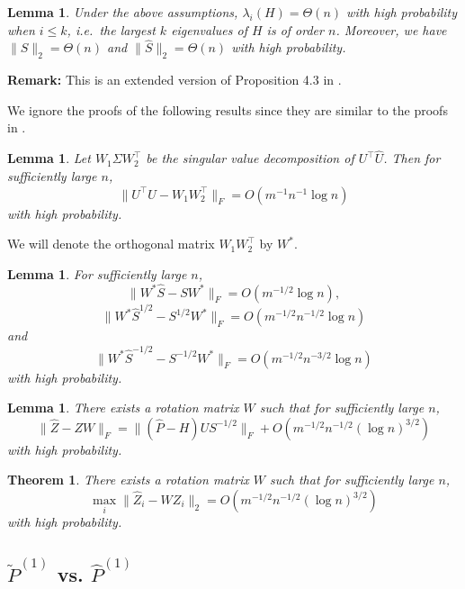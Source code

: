 \documentclass[a4paper]{article}
\newtheorem{lemma}[fact]{Lemma}
\newtheorem{theorem}[fact]{Theorem}
\renewcommand{\hat}{\widehat}
\begin{document}
\begin{lemma}
\label{lemma:eigSShatL1}
Under the above assumptions, $\lambda_i(H) = \Theta(n)$ with high probability when $i \le k$, i.e.\ the largest $k$ eigenvalues of $H$ is of order $n$. Moreover, we have $\| S \|_2 = \Theta(n)$ and $\| \hat{S} \|_2 = \Theta(n)$ with high probability.
\end{lemma}
\textbf{Remark:} This is an extended version of Proposition 4.3 in \citep{sussman2014consistent}.

We ignore the proofs of the following results since they are similar to the proofs in \citep{lyzinski2017community}.

\begin{lemma}
\label{lemma:AlmostOrthogonalL1}
Let $W_1 \Sigma W_2^{\top}$ be the singular value decomposition of $U^{\top} \hat{U}$. Then for sufficiently large $n$, 
\[
	\| U^{\top} \hat{U} - W_1 W_2^{\top} \|_F = O(m^{-1} n^{-1} \log n)
\]
with high probability.
\end{lemma}

We will denote the orthogonal matrix $W_1 W_2^{\top}$ by $W^*$.

\begin{lemma}
\label{lemma:exchangeL1}
For sufficiently large $n$,
\[
	\| W^* \hat{S} - S W^* \|_F = O(m^{-1/2} \log n),
\]
\[
	\|W^* \hat{S}^{1/2} - S^{1/2} W^* \|_F = O(m^{-1/2} n^{-1/2} \log n)
\]
and
\[
	\| W^* \hat{S}^{-1/2} - S^{-1/2} W^* \|_F = O(m^{-1/2} n^{-3/2} \log n)
\]
with high probability.
\end{lemma}

\begin{lemma}
\label{lemma:XhatDiffXWexpressionL1}
There exists a rotation matrix $W$ such that for sufficiently large $n$,
\[
	\|\hat{Z} - Z W\|_F = \| (\hat{P} - H) U S^{-1/2} \|_F + O(m^{-1/2} n^{-1/2} (\log n)^{3/2})
\]
with high probability.
\end{lemma}

\begin{theorem}
\label{thm:XhatDiffXWL1}
There exists a rotation matrix $W$ such that for sufficiently large $n$,
\[
	\max_i \| \hat{Z}_i - W Z_i \|_2 = O(m^{-1/2} n^{-1/2} (\log n)^{3/2})
\]
with high probability.
\end{theorem}


\subsection{$\widetilde{P}^{(1)}$ vs. $\hat{P}^{(1)}$}
\label{section:pf_MLEvsMLEASE2}
\end{document}
